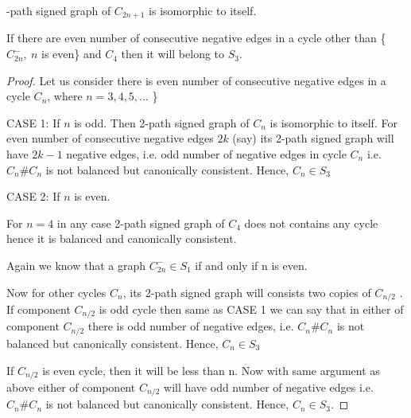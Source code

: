 
-path signed graph of $C_{2n+1}$ is isomorphic to itself.
\begin{theorem}
If there are even number of consecutive negative edges in a cycle other than \{ $C_{2n}^-,~ n$ is even\} and ${C_4}$ then it will 
belong to $S_3$.
\end{theorem}
\begin{proof}
 Let us consider there is even number of consecutive negative edges in a cycle $C_n$, where $n=3,4,5,\ldots$ \}
 
CASE 1: If $n$ is odd.
Then 2-path signed graph of $C_n$ is isomorphic to itself.
For even number of consecutive negative edges $2k$ (say) its 2-path signed graph will have $2k-1$ negative edges, i.e. odd number 
of negative edges in cycle $C_n$ i.e.$C_n\# C_n$ is not balanced but canonically consistent. 
Hence, $C_n\in S_3$

CASE 2: If $n$ is even.

For $n=4$ in any case 2-path signed graph of $C_4$ does not contains any cycle hence it is balanced and canonically consistent.

Again we know that a graph $C^-_{2n}\in S_1$ if and only if n is even.

Now for other cycles $C_n$, its 2-path signed graph will consists two copies of $C_{n/2}$ .
If component $C_{n/2}$ is odd cycle then same as CASE 1 we can say that in either of component $C_{n/2}$ there is odd number of 
negative edges, i.e. $C_n\# C_n$  is not balanced but canonically consistent.
Hence, $C_n\in S_3$

If $C_{n/2}$ is even cycle, then it will be less than n. Now with same argument as above either of component $C_{n/2}$ will have 
odd number of negative edges i.e. $C_n\# C_n$  is not balanced but canonically consistent.
Hence, $C_n\in S_3$.
\end{proof}

